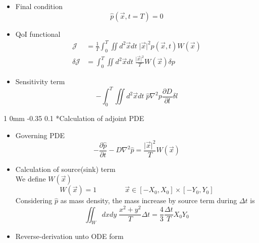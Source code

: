 \documentclass[11pt]{article}
\makeatletter
\renewcommand{\subsection}{\@startsection
{subsection}%
{1}%
{0mm}%
{-0.35\baselineskip}%
{0.1\baselineskip}%
{\normalfont\large\bfseries\color{brown}}}%
\def\Dpartial#1#2{ \frac{\partial #1}{\partial #2} }
\newcommand{\vx}{\vec{x}}
\newcommand{\Dt}{\Delta t}
\newcommand{\cJ}{\mathcal{J}}
\makeatother
\begin{document}
\begin{itemize}
\item Final condition
\begin{equation*}
\hat{p}(\vx,t=T) = 0
\end{equation*}
\item QoI functional
\begin{equation*}
\begin{split}
\cJ &= \frac{1}{T}\int_0^T\iint d^2\vx dt\; \vert \vx \vert^2 p(\vx,t)W(\vx) \\
\delta \cJ &= \int_0^T\iint d^2\vx dt\; \frac{\vert \vx \vert^2}{T}W(\vx)\delta p
\end{split}
\end{equation*}
\item Sensitivity term
\begin{equation*}
-\int_0^T\iint d^2\vx dt\; \hat{p}\nabla^2 p\Dpartial{D}{l}\delta l
\end{equation*}
\end{itemize}

\subsection*{Calculation of adjoint PDE}
\begin{itemize}
\item Governing PDE
\begin{equation}
-\Dpartial{\hat{p}}{t} - D\nabla^2\hat{p} = \frac{\vert \vx\vert^2}{T}W(\vx)
\end{equation}
\item Calculation of source(sink) term\\
We define $W(\vx)$
\begin{equation}
W(\vx) = 1\qquad\qquad \vx\in[-X_0,X_0]\times[-Y_0,Y_0]
\end{equation}
Considering $\hat{p}$ as mass density, the mass increase by source term during $\Dt$ is
\begin{equation*}
\iint_W dxdy\; \frac{x^2+y^2}{T}\Dt = \frac{4}{3}\frac{\Dt}{T}X_0Y_0
\end{equation*}
\item Reverse-derivation unto ODE form
\end{itemize}

\printbibliography
\end{document}
